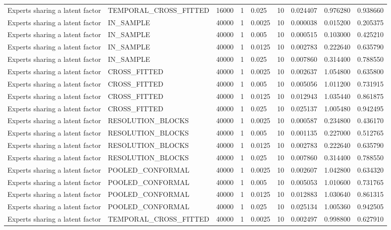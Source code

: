 \begin{tabular}{lllllllll}
Experts sharing a latent factor & TEMPORAL\_CROSS\_FITTED & 16000 & 1 & 0.025 & 10 & 0.024407 & 0.976280 & 0.938660 \\
Experts sharing a latent factor & IN\_SAMPLE & 40000 & 1 & 0.0025 & 10 & 0.000038 & 0.015200 & 0.205375 \\
Experts sharing a latent factor & IN\_SAMPLE & 40000 & 1 & 0.005 & 10 & 0.000515 & 0.103000 & 0.425210 \\
Experts sharing a latent factor & IN\_SAMPLE & 40000 & 1 & 0.0125 & 10 & 0.002783 & 0.222640 & 0.635790 \\
Experts sharing a latent factor & IN\_SAMPLE & 40000 & 1 & 0.025 & 10 & 0.007860 & 0.314400 & 0.788550 \\
Experts sharing a latent factor & CROSS\_FITTED & 40000 & 1 & 0.0025 & 10 & 0.002637 & 1.054800 & 0.635800 \\
Experts sharing a latent factor & CROSS\_FITTED & 40000 & 1 & 0.005 & 10 & 0.005056 & 1.011200 & 0.731915 \\
Experts sharing a latent factor & CROSS\_FITTED & 40000 & 1 & 0.0125 & 10 & 0.012943 & 1.035440 & 0.861875 \\
Experts sharing a latent factor & CROSS\_FITTED & 40000 & 1 & 0.025 & 10 & 0.025137 & 1.005480 & 0.942495 \\
Experts sharing a latent factor & RESOLUTION\_BLOCKS & 40000 & 1 & 0.0025 & 10 & 0.000587 & 0.234800 & 0.436170 \\
Experts sharing a latent factor & RESOLUTION\_BLOCKS & 40000 & 1 & 0.005 & 10 & 0.001135 & 0.227000 & 0.512765 \\
Experts sharing a latent factor & RESOLUTION\_BLOCKS & 40000 & 1 & 0.0125 & 10 & 0.002783 & 0.222640 & 0.635790 \\
Experts sharing a latent factor & RESOLUTION\_BLOCKS & 40000 & 1 & 0.025 & 10 & 0.007860 & 0.314400 & 0.788550 \\
Experts sharing a latent factor & POOLED\_CONFORMAL & 40000 & 1 & 0.0025 & 10 & 0.002607 & 1.042800 & 0.634320 \\
Experts sharing a latent factor & POOLED\_CONFORMAL & 40000 & 1 & 0.005 & 10 & 0.005053 & 1.010600 & 0.731765 \\
Experts sharing a latent factor & POOLED\_CONFORMAL & 40000 & 1 & 0.0125 & 10 & 0.012883 & 1.030640 & 0.861315 \\
Experts sharing a latent factor & POOLED\_CONFORMAL & 40000 & 1 & 0.025 & 10 & 0.025134 & 1.005360 & 0.942505 \\
Experts sharing a latent factor & TEMPORAL\_CROSS\_FITTED & 40000 & 1 & 0.0025 & 10 & 0.002497 & 0.998800 & 0.627910 \\

\end{tabular}
